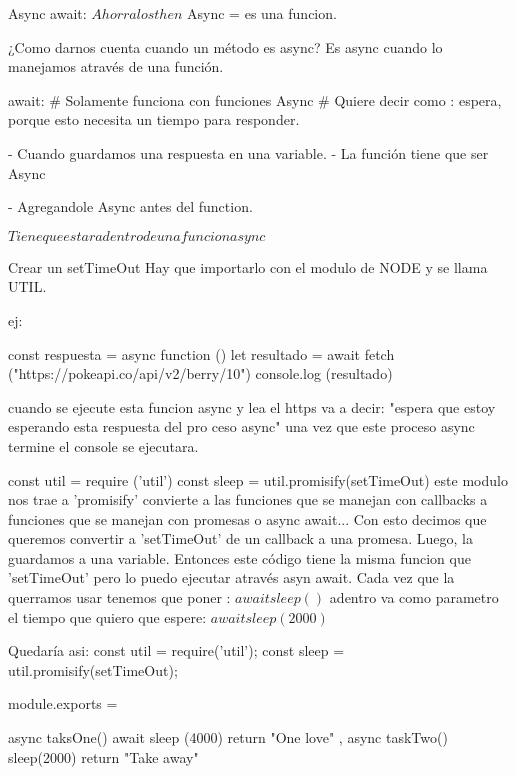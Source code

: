 Async await: $Ahorra los then$
Async = es una funcion.

¿Como darnos cuenta cuando un método es async?
Es async cuando lo manejamos através de una función.

await:
# Solamente funciona con funciones Async
# Quiere decir como : espera,  porque esto necesita un tiempo para responder.

- Cuando guardamos una respuesta en una variable.
- La función tiene que ser Async

- Agregandole Async antes del function.

$ Tiene que estar adentro de una funcion async$

{Crear un setTimeOut}
Hay que importarlo con el modulo de NODE y se llama UTIL.

ej: 

const respuesta = async function (){
    let resultado = await fetch ("https://pokeapi.co/api/v2/berry/10")
    console.log (resultado)
}

cuando se ejecute esta funcion async y lea el https va a decir: "espera que estoy esperando esta respuesta del pro ceso async"
una vez que este proceso async termine el console se ejecutara.

const util = require ('util')
const sleep = util.promisify(setTimeOut)
este modulo nos trae a 'promisify' convierte a las funciones que se manejan con callbacks a funciones que se manejan con promesas o async await...
Con esto decimos que queremos convertir a 'setTimeOut' de un callback a una promesa. Luego, la guardamos a una variable.
Entonces este código tiene la misma funcion que 'setTimeOut' pero lo puedo ejecutar através asyn await.
Cada vez que la querramos usar tenemos que poner : $ await sleep ()  $
adentro va como parametro el tiempo que quiero que espere: $  await sleep(2000)  $

Quedaría asi:
const util = require('util');
const sleep = util.promisify(setTimeOut);

module.exports = {

    async taksOne(){
        await sleep (4000)
        return "One love"
    },
    async taskTwo(){
        sleep(2000)
        return "Take away"
    }


}